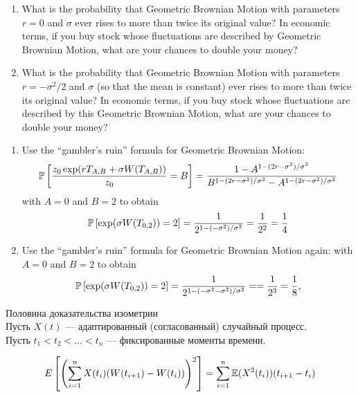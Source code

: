 \begin{problem}
  \begin{enumerate}
    \item What is the probability that Geometric Brownian
    Motion with parameters $r = 0$ and $\sigma$ ever rises to more than
    twice its original value? In economic terms, if you buy
    stock whose fluctuations are described by Geometric
    Brownian Motion, what are your chances to double your
    money?

    \item What is the probability that Geometric Brownian
    Motion with parameters $r = -\sigma^2/2$ and $\sigma$ (so
    that the mean is constant) ever rises to more than twice
    its original value?  In economic terms, if you buy stock
    whose fluctuations are described by this Geometric Brownian
    Motion, what are your chances to double your money?
  \end{enumerate}
\end{problem} 
\begin{solution} 

\begin{enumerate}
  \item Use the ``gambler's ruin'' formula for Geometric
  Brownian Motion:
  $$
     \P\left[ 
          \frac{ z_0 \exp( r T_{A,B} 
                       + \sigma W(T_{A,B}))}{z_0} = B 
          \right] =
          \frac{1 - A^{1 - (2r-\sigma^2)/\sigma^2}}
               {B^{1 - (2r-\sigma^2)/\sigma^2}
               - A^{1 - (2r-\sigma^2)/\sigma^2}}
  $$
  with $A = 0$ and $B = 2$ to obtain
  $$
     \P\left[ 
          \exp(\sigma W(T_{0,2})) = 2
          \right] =
          \frac{1}
               {2^{1 - (-\sigma^2)/\sigma^2}} =
              \frac{1}{2^2} = \frac{1}{4}
  $$

  \item Use the ``gambler's ruin'' formula for Geometric
  Brownian Motion again:
  with $A = 0$ and $B = 2$ to obtain
  $$
     \P\left[ 
          \exp(\sigma W(T_{0,2})) = 2
          \right] =
          \frac{1}
               {2^{1 - (-\sigma^2-\sigma^2)/\sigma^2}} =
            = \frac{1}{2^3} = \frac{1}{8},
  $$

\end{enumerate}
\end{solution}

\begin{problem}
 Половина доказательства изометрии \\
Пусть $X(t)$ --- адаптированный (согласованный) случайный процесс. \\
Пусть $t_{1}<t_{2}<\ldots<t_{n}$ --- фиксированные моменты времени. \\

\end{problem} 
\begin{solution} 
$$E\left[\left(\sum_{i=1}^{n}X(t_{i})(W(t_{i+1})-W(t_{i}))\right)^{2}\right]=\sum_{i=1}^{n}\E(X^{2}(t_{i}))(t_{i+1}-t_{i})$$
\end{solution}

